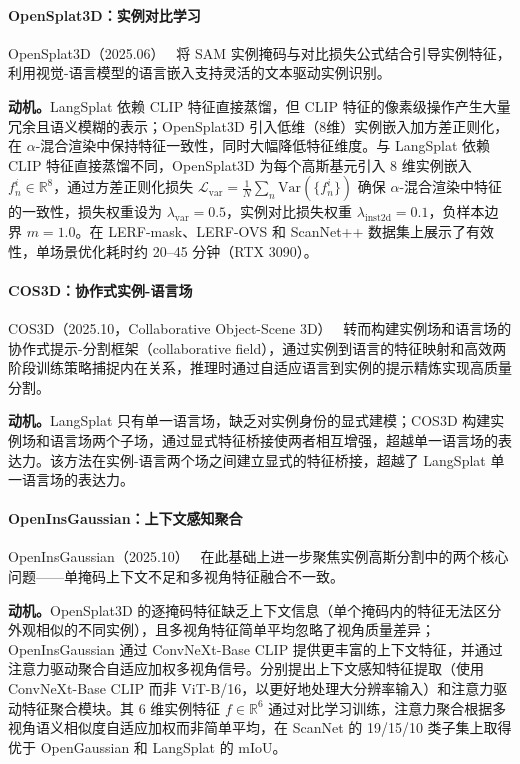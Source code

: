 \paragraph{OpenSplat3D：实例对比学习} OpenSplat3D（2025.06）~\cite{2506_07697} 将 SAM 实例掩码与对比损失公式结合引导实例特征，利用视觉-语言模型的语言嵌入支持灵活的文本驱动实例识别。

\textbf{动机。}LangSplat 依赖 CLIP 特征直接蒸馏，但 CLIP 特征的像素级操作产生大量冗余且语义模糊的表示；OpenSplat3D 引入低维（8维）实例嵌入加方差正则化，在 $\alpha$-混合渲染中保持特征一致性，同时大幅降低特征维度。与 LangSplat 依赖 CLIP 特征直接蒸馏不同，OpenSplat3D 为每个高斯基元引入 8 维实例嵌入 $f_n^i \in \mathbb{R}^8$，通过方差正则化损失 $\mathcal{L}_{\text{var}} = \frac{1}{N}\sum_n \text{Var}(\{f_n^i\})$ 确保 $\alpha$-混合渲染中特征的一致性，损失权重设为 $\lambda_{\text{var}} = 0.5$，实例对比损失权重 $\lambda_{\text{inst2d}} = 0.1$，负样本边界 $m=1.0$。在 LERF-mask、LERF-OVS 和 ScanNet++ 数据集上展示了有效性，单场景优化耗时约 20--45 分钟（RTX 3090）。

\paragraph{COS3D：协作式实例-语言场} COS3D（2025.10，Collaborative Object-Scene 3D）~\cite{2510_20238} 转而构建实例场和语言场的协作式提示-分割框架（collaborative field），通过实例到语言的特征映射和高效两阶段训练策略捕捉内在关系，推理时通过自适应语言到实例的提示精炼实现高质量分割。

\textbf{动机。}LangSplat 只有单一语言场，缺乏对实例身份的显式建模；COS3D 构建实例场和语言场两个子场，通过显式特征桥接使两者相互增强，超越单一语言场的表达力。该方法在实例-语言两个场之间建立显式的特征桥接，超越了 LangSplat 单一语言场的表达力。

\paragraph{OpenInsGaussian：上下文感知聚合} OpenInsGaussian（2025.10）~\cite{2510_18253} 在此基础上进一步聚焦实例高斯分割中的两个核心问题——单掩码上下文不足和多视角特征融合不一致。

\textbf{动机。}OpenSplat3D 的逐掩码特征缺乏上下文信息（单个掩码内的特征无法区分外观相似的不同实例），且多视角特征简单平均忽略了视角质量差异；OpenInsGaussian 通过 ConvNeXt-Base CLIP 提供更丰富的上下文特征，并通过注意力驱动聚合自适应加权多视角信号。分别提出上下文感知特征提取（使用 ConvNeXt-Base CLIP 而非 ViT-B/16，以更好地处理大分辨率输入）和注意力驱动特征聚合模块。其 6 维实例特征 $f \in \mathbb{R}^6$ 通过对比学习训练，注意力聚合根据多视角语义相似度自适应加权而非简单平均，在 ScanNet 的 19/15/10 类子集上取得优于 OpenGaussian 和 LangSplat 的 mIoU。

